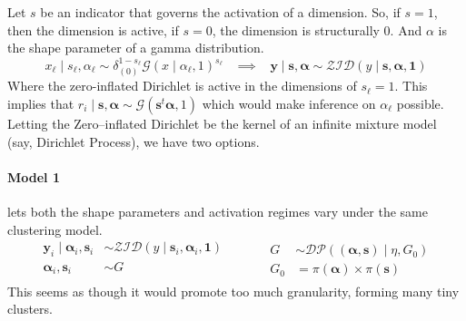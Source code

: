 \documentclass{article}
\begin{document}
Let $s$ be an indicator that governs the activation of a dimension.  So, if 
    $s = 1$, then the dimension is active, if $s = 0$, the dimension is 
    structurally 0.  And $\alpha$ is the shape parameter of a gamma distribution.
    \[
        x_{\ell} \mid s_{\ell}, \alpha_{\ell} \sim 
            \delta_{(0)}^{1-s_{\ell}}\mathcal{G}(x\mid\alpha_{\ell},1)^{s_{\ell}}
            \;\;\;\implies\;\;\;
            \bm{y} \mid \bm{s}, \bm{\alpha} \sim 
            \mathcal{ZID}(y \mid \bm{s}, \bm{\alpha}, \bm{1})
    \]
Where the zero-inflated Dirichlet is active in the dimensions of $s_{\ell} = 1$. 
    This implies that 
    $r_i\mid \bm{s},\bm{\alpha} \sim \mathcal{G}(\bm{s}^t\bm{\alpha}, 1)$ 
    which would make inference on $\alpha_{\ell}$ possible.  Letting the 
    Zero--inflated Dirichlet be the kernel of an infinite mixture model 
    (say, Dirichlet Process), we have two options.

\paragraph{Model 1} lets both the shape parameters and activation regimes vary 
    under the same clustering model.  
\[
    \begin{aligned}
    \bm{y}_i\mid\bm{\alpha}_i,\bm{s}_i &\sim 
        \mathcal{ZID}(y\mid \bm{s}_i,\bm{\alpha}_i, \bm{1})\\
    \bm{\alpha}_i, \bm{s}_i &\sim G\\
    \end{aligned}
    \;\hspace{1cm}\;
    \begin{aligned}
    G &\sim \mathcal{DP}\left((\bm{\alpha}, \bm{s}) \mid \eta, G_0\right)\\
    G_0 &= \pi(\bm{\alpha})\times\pi(\bm{s})
    \end{aligned}
\]
This seems as though it would promote too much granularity, forming many tiny 
    clusters.
\end{document}
